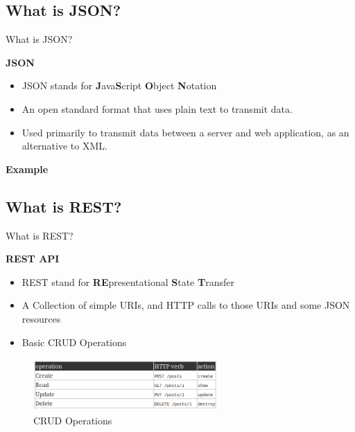 \documentclass[xcolor=dvipsnames]{beamer}
\begin{document}
\subsection{What is JSON?}
\begin{frame}{What is JSON?}

\textbf{JSON}\\

\begin{itemize}
\item JSON stands for \textbf{J}ava\textbf{S}cript \textbf{O}bject \textbf{N}otation
\item An open standard format that uses plain text to transmit data.
\item Used primarily to transmit data between a server and web application, as an alternative to XML.

\end{itemize}
\textbf{Example}

\end{frame}

\subsection{What is REST?}
\begin{frame}{What is REST?}

\textbf{REST API}

\begin{itemize}
\item REST stand for \textbf{RE}presentational \textbf{S}tate \textbf{T}ransfer
\item A Collection of simple URIs, and HTTP calls to those URIs and some JSON resources
\item Basic CRUD Operations
\end{itemize}

\begin{figure}
\includegraphics[width=7cm,height=2cm]{CRUD}
\caption{CRUD Operations \label{fig:CRUD Operations}}
\end{figure}

\end{frame}
\end{document}
